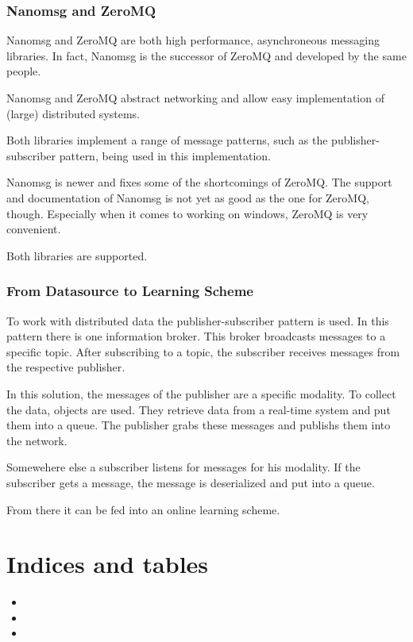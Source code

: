 \documentclass[letterpaper,10pt,english]{sphinxmanual}
\begin{document}
\subsection{Nanomsg and ZeroMQ}
\label{implementation:nanomsg-and-zeromq}
Nanomsg and ZeroMQ are both high performance, asynchroneous messaging libraries.
In fact, Nanomsg is the successor of ZeroMQ and developed by the same people.

Nanomsg and ZeroMQ abstract networking and allow easy implementation of (large)
distributed systems.

Both libraries implement a range of message patterns, such as the publisher-
subscriber pattern, being used in this implementation.

Nanomsg is newer and fixes some of the shortcomings of ZeroMQ. The support and
documentation of Nanomsg is not yet as good as the one for ZeroMQ, though.
Especially when it comes to working on windows, ZeroMQ is very convenient.

Both libraries are supported.


\subsection{From Datasource to Learning Scheme}
\label{implementation:from-datasource-to-learning-scheme}
To work with distributed data the publisher-subscriber pattern is used. In this
pattern there is one information broker. This broker broadcasts messages to a
specific topic. After subscribing to a topic, the subscriber receives messages
from the respective publisher.

In this solution, the messages of the publisher are a specific modality. To
collect the data,  objects are used. They retrieve data from
a real-time system and put them into a queue. The publisher grabs these
messages and publishs them into the network.

Somewehere else a subscriber listens for messages for his modality. If the
subscriber gets a message, the message is deserialized and put into a queue.

From there it can be fed into an online learning scheme.


\chapter{Indices and tables}
\label{index:indices-and-tables}\begin{itemize}
\item {} 

\item {} 

\item {} 

\end{itemize}



\renewcommand{\indexname}{Index}
\printindex
\end{document}
